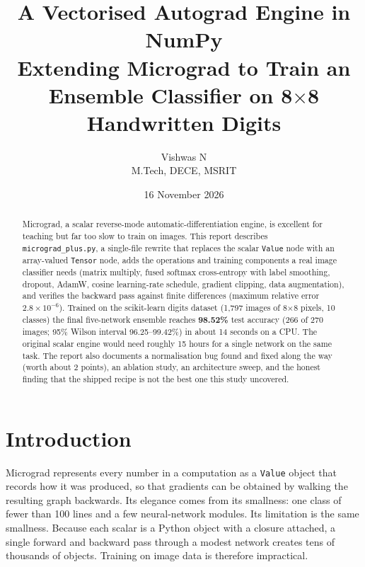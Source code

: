 \documentclass[11pt,a4paper]{article}
\title{\textbf{A Vectorised Autograd Engine in NumPy\\[2pt]
\large Extending Micrograd to Train an Ensemble Classifier on 8$\times$8 Handwritten Digits}}
\author{Vishwas N\\ M.Tech, DECE, MSRIT}
\date{16 November 2026}
\newcommand{\code}[1]{\texttt{#1}}
\begin{document}
\maketitle

\begin{abstract}
\noindent Micrograd, a scalar reverse-mode automatic-differentiation engine, is excellent for teaching but far too slow to train on images. This report describes \code{micrograd\_plus.py}, a single-file rewrite that replaces the scalar \code{Value} node with an array-valued \code{Tensor} node, adds the operations and training components a real image classifier needs (matrix multiply, fused softmax cross-entropy with label smoothing, dropout, AdamW, cosine learning-rate schedule, gradient clipping, data augmentation), and verifies the backward pass against finite differences (maximum relative error $2.8\times10^{-6}$). Trained on the scikit-learn digits dataset (1{,}797 images of 8$\times$8 pixels, 10 classes) the final five-network ensemble reaches \textbf{98.52\%} test accuracy (266 of 270 images; 95\% Wilson interval 96.25--99.42\%) in about 14 seconds on a CPU. The original scalar engine would need roughly 15 hours for a single network on the same task. The report also documents a normalisation bug found and fixed along the way (worth about 2 points), an ablation study, an architecture sweep, and the honest finding that the shipped recipe is not the best one this study uncovered.
\end{abstract}

\tableofcontents
\newpage

\section{Introduction}
Micrograd represents every number in a computation as a \code{Value} object that records how it was produced, so that gradients can be obtained by walking the resulting graph backwards. Its elegance comes from its smallness: one class of fewer than 100 lines and a few neural-network modules. Its limitation is the same smallness. Because each scalar is a Python object with a closure attached, a single forward and backward pass through a modest network creates tens of thousands of objects. Training on image data is therefore impractical.
\end{document}
